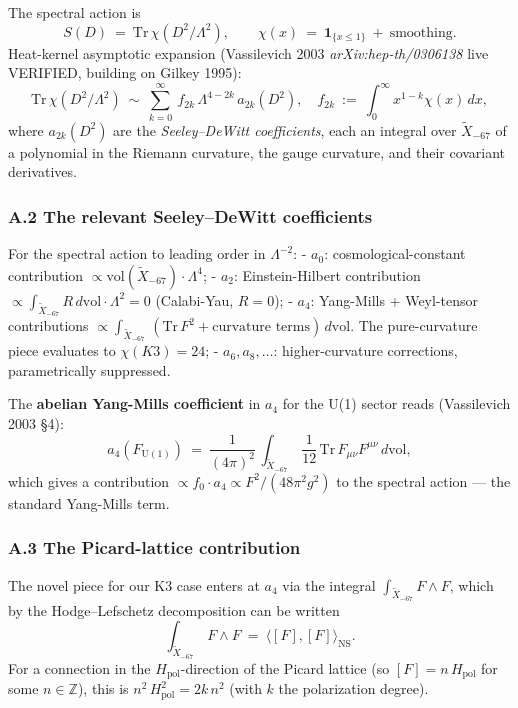 \documentclass[
  11pt,
  a4paper,
]{article}
\begin{document}
The spectral action is
\[
S(D)\ =\ \mathrm{Tr}\,\chi(D^2/\Lambda^2),\qquad
\chi(x)\ =\ \mathbf 1_{\{x \le 1\}}\ +\ \text{smoothing}.
\]
Heat-kernel asymptotic expansion (Vassilevich 2003 \emph{arXiv:hep-th/0306138} live VERIFIED, building on Gilkey 1995):
\[
\mathrm{Tr}\,\chi(D^2/\Lambda^2)\ \sim\ \sum_{k=0}^\infty\ f_{2k}\,\Lambda^{4-2k}\,a_{2k}(D^2),\quad
f_{2k}\ :=\ \int_0^\infty x^{1-k}\chi(x)\,dx,
\]
where \(a_{2k}(D^2)\) are the \emph{Seeley--DeWitt coefficients}, each an integral over \(\tilde X_{-67}\) of a polynomial in the Riemann curvature, the gauge curvature, and their covariant derivatives.

\hypertarget{a.2-the-relevant-seeleydewitt-coefficients}{%
\subsubsection{A.2 The relevant Seeley--DeWitt coefficients}\label{a.2-the-relevant-seeleydewitt-coefficients}}

For the spectral action to leading order in \(\Lambda^{-2}\):
- \(a_0\): cosmological-constant contribution \(\propto \mathrm{vol}(\tilde X_{-67})\cdot\Lambda^4\);
- \(a_2\): Einstein-Hilbert contribution \(\propto \int_{\tilde X_{-67}}R\,d\mathrm{vol}\cdot\Lambda^2 = 0\) (Calabi-Yau, \(R = 0\));
- \(a_4\): Yang-Mills + Weyl-tensor contributions \(\propto \int_{\tilde X_{-67}}\,(\mathrm{Tr}\,F^2 + \text{curvature terms})\,d\mathrm{vol}\). The pure-curvature piece evaluates to \(\chi(K3) = 24\);
- \(a_6, a_8, \ldots\): higher-curvature corrections, parametrically suppressed.

The \textbf{abelian Yang-Mills coefficient} in \(a_4\) for the U(1) sector reads (Vassilevich 2003 §4):
\[
a_4(F_{\mathrm{U(1)}})\ =\ \frac{1}{(4\pi)^2}\,\int_{\tilde X_{-67}}\,\frac{1}{12}\,\mathrm{Tr}\,F_{\mu\nu}F^{\mu\nu}\,d\mathrm{vol},
\]
which gives a contribution \(\propto f_0\cdot a_4 \propto F^2/(48\pi^2 g^2)\) to the spectral action --- the standard Yang-Mills term.

\hypertarget{a.3-the-picard-lattice-contribution}{%
\subsubsection{A.3 The Picard-lattice contribution}\label{a.3-the-picard-lattice-contribution}}

The novel piece for our K3 case enters at \(a_4\) via the integral \(\int_{\tilde X_{-67}} F\wedge F\), which by the Hodge--Lefschetz decomposition can be written
\[
\int_{\tilde X_{-67}}\,F\wedge F\ =\ \langle [F], [F]\rangle_{\mathrm{NS}}.
\]
For a connection in the \(H_{\mathrm{pol}}\)-direction of the Picard lattice (so \([F] = n\,H_{\mathrm{pol}}\) for some \(n \in \mathbb Z\)), this is \(n^2\,H_{\mathrm{pol}}^2 = 2k\,n^2\) (with \(k\) the polarization degree).
\end{document}
